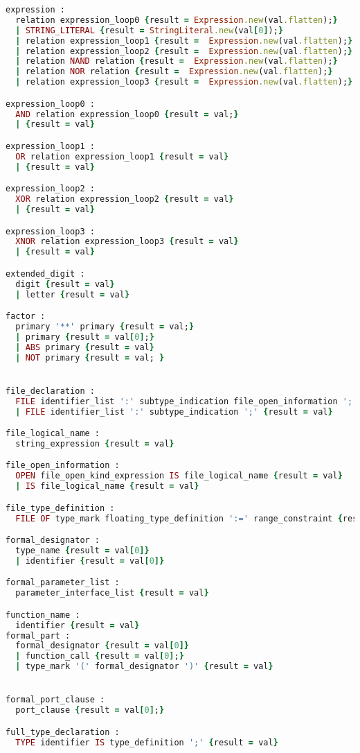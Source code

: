 \begin{lstlisting}[language=Ruby, style=rubystyle]
expression :
  relation expression_loop0 {result = Expression.new(val.flatten);}
  | STRING_LITERAL {result = StringLiteral.new(val[0]);}
  | relation expression_loop1 {result =  Expression.new(val.flatten);}
  | relation expression_loop2 {result =  Expression.new(val.flatten);}
  | relation NAND relation {result =  Expression.new(val.flatten);}
  | relation NOR relation {result =  Expression.new(val.flatten);}
  | relation expression_loop3 {result =  Expression.new(val.flatten);}

expression_loop0 :
  AND relation expression_loop0 {result = val;}
  | {result = val}

expression_loop1 :
  OR relation expression_loop1 {result = val}
  | {result = val}

expression_loop2 :
  XOR relation expression_loop2 {result = val}
  | {result = val}

expression_loop3 :
  XNOR relation expression_loop3 {result = val}
  | {result = val}

extended_digit :
  digit {result = val}
  | letter {result = val}

factor :
  primary '**' primary {result = val;}
  | primary {result = val[0];}
  | ABS primary {result = val}
  | NOT primary {result = val; }


file_declaration :
  FILE identifier_list ':' subtype_indication file_open_information ';' {result = val}
  | FILE identifier_list ':' subtype_indication ';' {result = val}

file_logical_name :
  string_expression {result = val}

file_open_information :
  OPEN file_open_kind_expression IS file_logical_name {result = val}
  | IS file_logical_name {result = val}

file_type_definition :
  FILE OF type_mark floating_type_definition ':=' range_constraint {result = val}

formal_designator :
  type_name {result = val[0]}
  | identifier {result = val[0]}

formal_parameter_list :
  parameter_interface_list {result = val}

function_name :
  identifier {result = val}
formal_part :
  formal_designator {result = val[0]}
  | function_call {result = val[0];}
  | type_mark '(' formal_designator ')' {result = val}


formal_port_clause :
  port_clause {result = val[0];}

full_type_declaration :
  TYPE identifier IS type_definition ';' {result = val}


\end{lstlisting}
